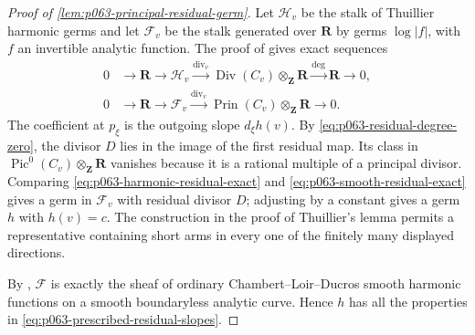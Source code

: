 \begin{proof}[Proof of \cref{lem:p063-principal-residual-germ}]
Let \(\mathcal H_v\) be the stalk of Thuillier harmonic germs and let
\(\mathcal F_v\) be the stalk generated over \(\mathbf R\) by germs
\(\log|f|\), with \(f\) an invertible analytic function.  The proof of
\cite[Lemma~2.3.22]{Thu05} gives exact sequences
\begin{align}
 0&\longrightarrow\mathbf R\longrightarrow\mathcal H_v
 \xrightarrow{\operatorname{div}_v}
 \operatorname{Div}(C_v)\otimes_{\mathbf Z}\mathbf R
 \xrightarrow{\deg}\mathbf R\longrightarrow0,
\label{eq:p063-harmonic-residual-exact}\\
 0&\longrightarrow\mathbf R\longrightarrow\mathcal F_v
 \xrightarrow{\operatorname{div}_v}
 \operatorname{Prin}(C_v)\otimes_{\mathbf Z}\mathbf R
 \longrightarrow0.
\label{eq:p063-smooth-residual-exact}
\end{align}
The coefficient at \(p_\xi\) is the outgoing slope \(d_\xi h(v)\).
By \eqref{eq:p063-residual-degree-zero}, the divisor \(D\) lies in the
image of the first residual map.  Its class in
\(\operatorname{Pic}^0(C_v)\otimes_{\mathbf Z}\mathbf R\) vanishes
because it is a rational multiple of a principal divisor.  Comparing
\eqref{eq:p063-harmonic-residual-exact} and
\eqref{eq:p063-smooth-residual-exact} gives a germ in \(\mathcal F_v\)
with residual divisor \(D\); adjusting by a constant gives a germ \(h\)
with \(h(v)=c\).
The construction in the proof of Thuillier's lemma permits a
representative containing short arms in every one of the finitely many
displayed directions.

By \cite[Remark~15.10]{GJR26}, \(\mathcal F\) is exactly the sheaf of
ordinary Chambert--Loir--Ducros smooth harmonic functions on a smooth
boundaryless analytic curve.  Hence \(h\) has all the properties in
\eqref{eq:p063-prescribed-residual-slopes}.
\end{proof}

